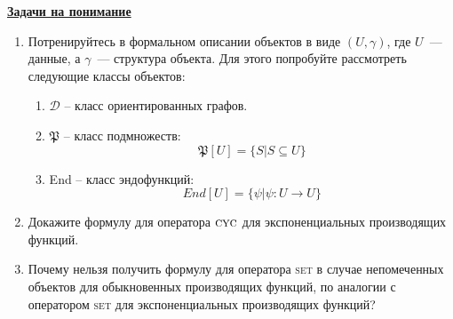 \documentclass{article}
\theoremstyle{definition}
\begin{document}
\begin{center}
	{\large\underline{\textbf{Задачи на понимание}}}    	
\end{center}
\begin{enumerate}
\item Потренируйтесь в формальном описании объектов в виде \( (U, \gamma) \), 
где \( U \)~--- данные, а \( \gamma \)~--- структура объекта. Для этого 
попробуйте рассмотреть следующие классы объектов:
\begin{enumerate}
	\item \( \mathcal D \) -- класс ориентированных графов.
	\item \( \mathfrak P \) -- класс подмножеств:
	\[
		\mathfrak P[U] = \{ S | S \subseteq U \}
	\]
	\item End -- класс эндофункций:
	\[
		End[U] = \{ \psi | \psi \colon U \to U \}
	\]
\end{enumerate}
\item Докажите формулу для оператора \( \textsc{cyc} \) для экспоненциальных 
производящих функций.
\item Почему нельзя получить формулу для оператора \textsc{set} в случае 
непомеченных объектов для обыкновенных производящих функций, по аналогии с 
оператором \textsc{set} для экспоненциальных производящих функций?
\end{enumerate}
\end{document}
